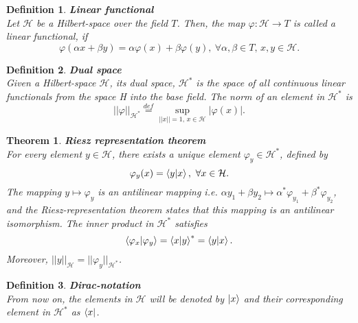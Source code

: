 \documentclass[12pt, a4paper]{article}
\newtheorem{theorem}{Theorem}
\newtheorem{definition}{Definition}
\begin{document}
\begin{definition}
    \textbf{Linear functional}\\
    Let $\mathcal H$ be a Hilbert-space over the field $T$. Then, the map $\varphi:\mathcal H \rightarrow T$ is  
    called a linear functional, if
    \begin{equation*}
        \varphi(\alpha x + \beta y) = \alpha \varphi(x) + \beta \varphi(y),~
        \forall \alpha, \beta \in T,\, x, y \in \mathcal H.
    \end{equation*}
\end{definition}

\begin{definition}
    \textbf{Dual space}\\
    Given a Hilbert-space $\mathcal H$, its dual space, $\mathcal H^*$ is the space of all continuous linear
    functionals from the space H into the base field.
    The norm of an element in $\mathcal H^*$ is 
    \begin{equation*}
        ||\varphi||_{\mathcal H^*} \overset{def}{=} \underset{||x||=1,\, x \in \mathcal H}{\sup} |\varphi(x)|.
    \end{equation*}
\end{definition}

\begin{theorem}
    \textbf{Riesz representation theorem}\\
    For every element $y \in \mathcal H$, there exists a unique element $\varphi_{y} \in \mathcal H^*$, defined by
    \begin{equation*}
        \varphi_{y}(x) = \braket{y| x},~\forall x \in \mathcal H.
    \end{equation*}
    The mapping $y \mapsto \varphi_{y}$ is an antilinear mapping i.e. $\alpha y_1 + \beta y_2 
    \mapsto \alpha^* \varphi_{y_1} + \beta^* \varphi_{y_2}$, and the Riesz-representation theorem states 
    that this mapping is an antilinear isomorphism. The inner product in $\mathcal H^*$ satisfies 
    \begin{equation*}
        \braket{\varphi_{x}|\varphi_{y}} = \braket{x|y}^* = \braket{y | x}.
    \end{equation*}
    Moreover, $||y||_{\mathcal H} = ||\varphi_{y}||_{\mathcal H^*}$.
\end{theorem}

\begin{definition}
    \textbf{Dirac-notation}\\
    From now on, the elements in $\mathcal H$ will be denoted by $\ket x$ and their corresponding
    element in $\mathcal H^*$ as $\bra x$.
\end{definition}
\end{document}
